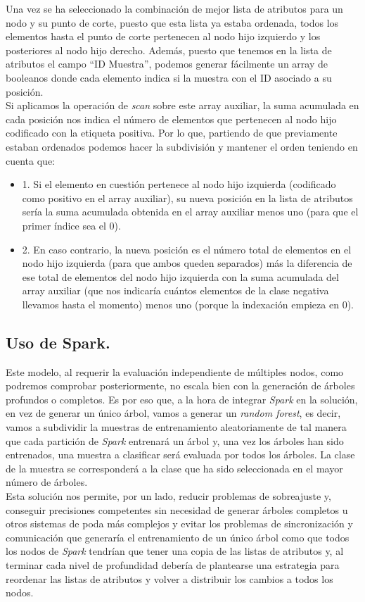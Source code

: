  Una vez se ha seleccionado la combinación de mejor lista de atributos para un nodo y su punto de corte, puesto que esta lista ya estaba ordenada, todos los elementos hasta el punto de corte pertenecen al nodo hijo izquierdo y los posteriores al nodo hijo derecho. Además, puesto que tenemos en la lista de atributos el campo ``ID Muestra'', podemos generar fácilmente un array de booleanos donde cada elemento indica si la muestra con el ID asociado a su posición.\\

 Si aplicamos la operación de \textit{scan} sobre este array auxiliar, la suma acumulada en cada posición nos indica el número de elementos que pertenecen al nodo hijo codificado con la etiqueta positiva. Por lo que, partiendo de que previamente estaban ordenados podemos hacer la subdivisión y mantener el orden teniendo en cuenta que:\\

 \begin{itemize}
    \item 1. Si el elemento en cuestión pertenece al nodo hijo izquierda (codificado como positivo en el array auxiliar), su nueva posición en la lista de atributos sería la suma acumulada obtenida en el array auxiliar menos uno (para que el primer índice sea el 0).
    \item 2. En caso contrario, la nueva posición es el número total de elementos en el nodo hijo izquierda (para que ambos queden separados) más la diferencia de ese total de elementos del nodo hijo izquierda con la suma acumulada del array auxiliar (que nos indicaría cuántos elementos de la clase negativa llevamos hasta el momento) menos uno (porque la indexación empieza en 0).
 \end{itemize}


\subsection{Uso de Spark.}
Este modelo, al requerir la evaluación independiente de múltiples nodos, como podremos comprobar posteriormente, no escala bien con la generación de árboles profundos o completos. Es por eso que, a la hora de integrar \textit{Spark} en la solución, en vez de generar un único árbol, vamos a generar un \textit{random forest}, es decir, vamos a subdividir la muestras de entrenamiento aleatoriamente de tal manera que cada partición de \textit{Spark} entrenará un árbol y, una vez los árboles han sido entrenados, una muestra a clasificar será evaluada por todos los árboles. La clase de la muestra se corresponderá a la clase que ha sido seleccionada en el mayor número de árboles. \\

Esta solución nos permite, por un lado, reducir problemas de sobreajuste y, conseguir precisiones competentes sin necesidad de generar árboles completos u otros sistemas de poda más complejos y evitar los problemas de sincronización y comunicación que generaría el entrenamiento de un único árbol como que todos los nodos de \textit{Spark} tendrían que tener una copia de las listas de atributos y, al terminar cada nivel de profundidad debería de plantearse una estrategia para reordenar las listas de atributos y volver a distribuir los cambios a todos los nodos.
